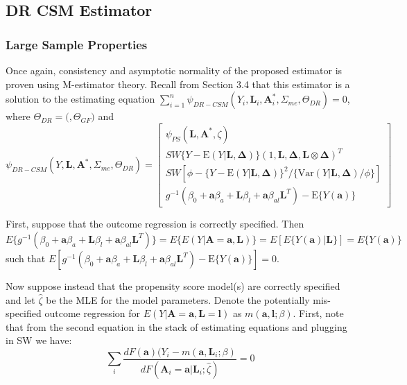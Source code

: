 \documentclass[12pt]{article}
\begin{document}
\subsection{DR CSM Estimator}

\subsubsection{Large Sample Properties}

Once again, consistency and asymptotic normality of the proposed estimator is proven using M-estimator theory. Recall from Section 3.4 that this estimator is a solution to the estimating equation \newline $\sum_{i=1}^{n} \psi_{DR-CSM}(Y_{i}, \bm{L}_{i}, \bm{A}_{i}^{*}, \Sigma_{me}, \Theta_{DR}) = 0$, where $\Theta_{DR} = ($\zeta$, \Theta_{GF})$ and
\begin{equation*}
    \psi_{DR-CSM}(Y, \bm{L}, \bm{A}^{*}, \Sigma_{me}, \Theta_{DR}) =
    \begin{bmatrix}
        \psi_{PS}(\bm{L}, \bm{A}^{*}, \zeta) \\
       SW\{ Y - \text{E}(Y | \bm{L}, \bm{\Delta}) \} (1, \bm{L}, \bm{\Delta}, \bm{L} \otimes \bm{\Delta})^{T} \\
        SW[\phi - \{ Y - \text{E}(Y | \bm{L}, \bm{\Delta}) \}^{2} / \{ \text{Var}(Y | \bm{L}, \bm{\Delta}) / \phi \}] \\
        g^{-1}(\beta_{0} + \bm{a}\beta_{a} + \bm{L}\beta_{l} +
        \bm{a}\beta_{al}\bm{L}^{T}) - \text{E} \{ Y(\bm{a}) \}
    \end{bmatrix}
\end{equation*}

First, suppose that the outcome regression is correctly specified. Then $E\{ g^{-1}(\beta_{0} + \bm{a}\beta_{a} + \bm{L}\beta_{l} + \bm{a}\beta_{al}\bm{L}^{T}) \} = E \{ E(Y | \bm{A} = \bm{a}, \bm{L}) \} = E[E \{ Y(\bm{a}) | \bm{L} \}] = E \{ Y(\bm{a}) \}$ such that $E[g^{-1}(\beta_{0} + \bm{a}\beta_{a} + \bm{L}\beta_{l} + \bm{a}\beta_{al}\bm{L}^{T}) - \text{E} \{ Y(\bm{a}) \}] = 0$.

Now suppose instead that the propensity score model(s) are correctly specified and let $\hat{\zeta}$ be the MLE for the model parameters. Denote the potentially mis-specified outcome regression for $E(Y | \bm{A} = \bm{a}, \bm{L} = \bm{l})$ as $m(\bm{a}, \bm{l}; \beta)$. First, note that from the second equation in the stack of estimating equations and plugging in SW we have:
\begin{equation*}
\sum\limits_{i} \frac{dF(\bm{a})(Y_{i} - m(\bm{a}, \bm{L}_{i}; \beta)}{dF(\bm{A}_{i} = \bm{a} | \bm{L}_{i}; \hat{\zeta})} = 0
\end{equation*}
\end{document}
